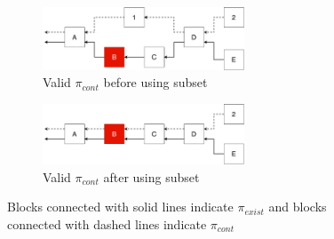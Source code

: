 \begin{figure}[ht]
\begin{subfigure}{.5\textwidth}
  \centering
  \includegraphics[width=6cm]{../images/Subset_1.pdf}
  \caption{Valid $\pi_{cont}$ before using subset}
  \label{figure:before__subset}
\end{subfigure}
\begin{subfigure}{.5\textwidth}
  \centering
  \includegraphics[width=6cm]{../images/Subset_2.pdf}
  \caption{Valid $\pi_{cont}$ after using subset}
  \label{figure:after_subset}
\end{subfigure}
\caption{Blocks connected with solid lines indicate $\pi_{exist}$ and blocks
connected with dashed lines indicate $\pi_{cont}$}
\label{fig:fig}
\end{figure}
